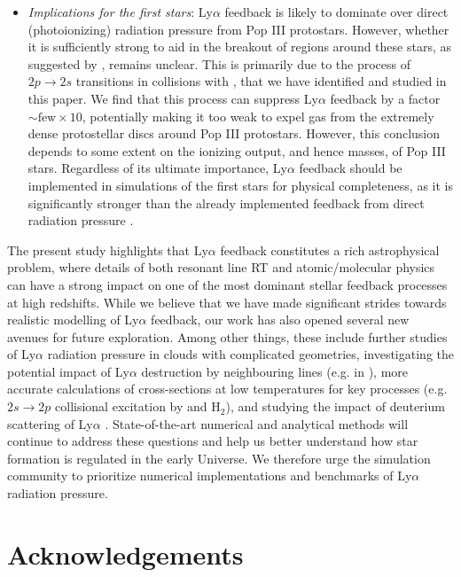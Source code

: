 \documentclass[fleqn,usenatbib]{mnras}
\newcommand\HI{\ion{H}{I}\xspace} %
\newcommand\HII{\ion{H}{II}\xspace} %
\newcommand\HeI{\ion{He}{I}\xspace} %
\newcommand\OI{\ion{O}{I}\xspace} %
\begin{document}
\begin{itemize}
    \item \textit{Implications for the first stars}:  Ly$\alpha$ feedback is likely to dominate over direct (photoionizing) radiation pressure from Pop III protostars. However, whether it is sufficiently strong to aid in the breakout of \HII regions around these stars, as suggested by \cite{Jaura2022}, remains unclear. This is primarily due to the process of $2p \rightarrow 2s$ transitions in collisions with \HI, that we have identified and studied in this paper. We find that this process can suppress Ly$\alpha$ feedback by a factor $\sim \textrm{few} \times 10$, potentially making it too weak to expel gas from the extremely dense protostellar discs around Pop III protostars. However, this conclusion depends to some extent on the ionizing output, and hence masses, of Pop III stars. Regardless of its ultimate importance, Ly$\alpha$ feedback should be implemented in simulations of the first stars for physical completeness, as it is significantly stronger than the already implemented feedback from direct radiation pressure \citep[e.g.][]{Jaura2022, Latif2022}.
\end{itemize}

The present study highlights that Ly$\alpha$ feedback constitutes a rich astrophysical problem, where details of both resonant line RT and atomic/molecular physics can have a strong impact on one of the most dominant stellar feedback processes at high redshifts. While we believe that we have made significant strides towards realistic modelling of Ly$\alpha$ feedback, our work has also opened several new avenues for future exploration. Among other things, these include further studies of Ly$\alpha$ radiation pressure in clouds with complicated geometries, investigating the potential impact of Ly$\alpha$ destruction by neighbouring lines (e.g. in \OI), more accurate calculations of cross-sections at low temperatures for key processes (e.g. $2s \rightarrow 2p$ collisional excitation by \HeI and H$_2$), and studying the impact of deuterium scattering of Ly$\alpha$ \citep{Dijkstra2006, RASCAS}. State-of-the-art numerical and analytical methods will continue to address these questions and help us better understand how star formation is regulated in the early Universe. We therefore urge the simulation community to prioritize numerical implementations and benchmarks of Ly$\alpha$ radiation pressure.

\section*{Acknowledgements}
\end{document}
